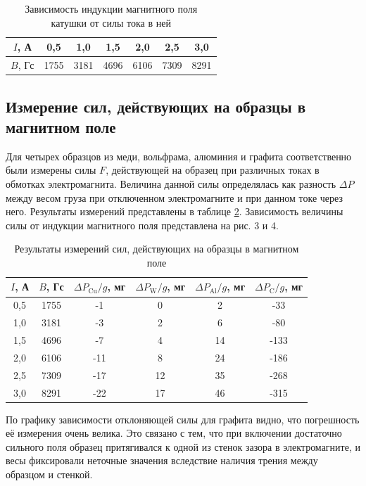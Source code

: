 \documentclass[a4paper,12pt]{article} %
\begin{document}
\begin{table}[h]
    \centering
    \begin{tabular}{|c|c|c|c|c|c|c|}
	\hline
	$ I $, А  & 0,5  & 1,0  & 1,5  & 2,0  & 2,5  & 3,0  \\ \hline
	$ B $, Гс & 1755 & 3181 & 4696 & 6106 & 7309 & 8291 \\ \hline
    \end{tabular}
    \caption{Зависимость индукции магнитного поля катушки от силы тока в ней}
    \label{tab:my-table1}
\end{table}

\subsection{Измерение сил, действующих на образцы в магнитном поле}

Для четырех образцов из меди, вольфрама, алюминия и графита соответственно были измерены силы $F$, действующей на образец при различных токах в обмотках электромагнита. Величина данной силы определялась как разность $\Delta P$ между весом груза при отключенном электромагните и при данном токе через него. Результаты измерений представлены в таблице \ref{tab:my-table2}. Зависимость величины силы от индукции магнитного поля представлена на рис. 3 и 4.

\begin{table}[h]
\begin{center}
   \begin{tabular}{|c|c|c|c|c|c|} \hline
    $I$, А & $B$, Гс & $\Delta P_\text{Cu}/g$, мг & $\Delta P_\text{W}/g$, мг & $\Delta P_\text{Al}/g$, мг & $\Delta P_\text{C}/g$, мг \\ \hline 
    0,5 & 1755 &  -1 &  0 &  2 &  -33 \\ \hline 
    1,0 & 3181 &  -3 &  2 &  6 &  -80 \\ \hline
    1,5 & 4696 &  -7 &  4 & 14 & -133 \\ \hline
    2,0 & 6106 & -11 &  8 & 24 & -186 \\ \hline
    2,5 & 7309 & -17 & 12 & 35 & -268 \\ \hline
    3,0 & 8291 & -22 & 17 & 46 & -315 \\ \hline
    \end{tabular} 
\end{center}    
\caption{Результаты измерений сил, действующих на образцы в магнитном поле}
\label{tab:my-table2}
\end{table}

По графику зависимости отклоняющей силы для графита видно, что погрешность её измерения очень велика. Это связано с тем, что при включении достаточно сильного поля образец притягивался к одной из стенок зазора в электромагните, и весы фиксировали неточные значения вследствие наличия трения между образцом и стенкой.
\end{document}
